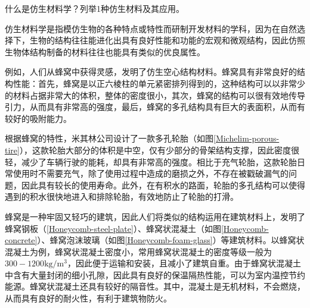 \documentclass{assignment}
\begin{document}
\begin{ti}
    什么是仿生材料学？列举1种仿生材料及其应用。
\end{ti}
\begin{da}
    仿生材料学是指模仿生物的各种特点或特性而研制开发材料的学科，因为在自然选择下，生物的结构往往能进化出具有良好性能和功能的宏观和微观结构，因此仿照生物体结构制备的材料往往也能具有类似的优良属性。

    例如，人们从蜂窝中获得灵感，发明了仿生空心结构材料。蜂窝具有非常良好的结构性能：首先，蜂窝是以正六棱柱的单元紧密排列得到的，这种结构可以以非常少的材料占据非常大的体积，整体的密度很小，其次，蜂窝的结构可以很有效地传导引力，从而具有非常高的强度，最后，蜂窝的多孔结构具有巨大的表面积，从而有较好的吸附能力。

    根据蜂窝的特性，米其林公司设计了一款多孔轮胎\cite{Michelim-porous-tire}（如图\ref{Michelim-porous-tire}），这款轮胎大部分的体积是中空，仅有少部分的骨架结构支撑，因此密度很轻，减少了车辆行驶的能耗，却具有非常高的强度。相比于充气轮胎，这款轮胎日常使用时不需要充气，除了使用过程中造成的磨损之外，不存在被戳破漏气的问题，因此具有较长的使用寿命。此外，在有积水的路面，轮胎的多孔结构可以使得遇到的积水很快地进入和排除轮胎，有效地防止了轮胎的打滑。

    蜂窝是一种牢固又轻巧的建筑，因此人们将类似的结构运用在建筑材料上，发明了蜂窝钢板（\ref{Honeycomb-steel-plate}）、蜂窝状混凝土（如图\ref{Honeycomb-concrete}）、蜂窝泡沫玻璃（如图\ref{Honeycomb-foam-glass}）等建筑材料\cite{Wang2019Application-and-prospect-of-new-bionic-materials}。以蜂窝状混凝土为例，蜂窝状混凝土密度小，常用蜂窝状混凝土的密度等级一般为$300-1200\mathrm{kg}/\mathrm{m}^3$，因此便于运输和安装，且减小了建筑自重。由于蜂窝状混凝土中含有大量封闭的细小孔隙，因此具有良好的保温隔热性能，可以为室内温控节约能源。蜂窝状混凝土还具有较好的隔音性。其中，混凝土是无机材料，不会燃烧，从而具有良好的耐火性，有利于建筑物防火。


\end{da}
\end{document}

